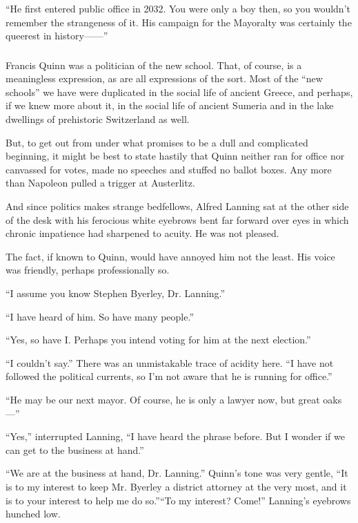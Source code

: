 \documentclass[10pt,a5paper,twoside]{book}
\begin{document}
“He first entered public office in 2032. You were only a boy then, so you wouldn’t remember the strangeness of it. His campaign for the Mayoralty was certainly the queerest in history——”

\normalfont

\subsubsection*{}
Francis Quinn was a politician of the new school. That, of course, is a meaningless expression, as are all expressions of the sort. Most of the “new schools” we have were duplicated in the social life of ancient Greece, and perhaps, if we knew more about it, in the social life of ancient Sumeria and in the lake dwellings of prehistoric Switzerland as well.

But, to get out from under what promises to be a dull and complicated beginning, it might be best to state hastily that Quinn neither ran for office nor canvassed for votes, made no speeches and stuffed no ballot boxes. Any more than Napoleon pulled a trigger at Austerlitz.

And since politics makes strange bedfellows, Alfred Lanning sat at the other side of the desk with his ferocious white eyebrows bent far forward over eyes in which chronic impatience had sharpened to acuity. He was not pleased.

The fact, if known to Quinn, would have annoyed him not the least. His voice was friendly, perhaps professionally so.

“I assume you know Stephen Byerley, Dr. Lanning.”

“I have heard of him. So have many people.”

“Yes, so have I. Perhaps you intend voting for him at the next election.”

“I couldn’t say.” There was an unmistakable trace of acidity here. “I have not followed the political currents, so I’m not aware that he is running for office.”

“He may be our next mayor. Of course, he is only a lawyer now, but great oaks —”

“Yes,” interrupted Lanning, “I have heard the phrase before. But I wonder if we can get to the business at hand.”

“We are at the business at hand, Dr. Lanning.” Quinn’s tone was very gentle, “It is to my interest to keep Mr. Byerley a district attorney at the very most, and it is to your interest to help me do so.”“To my interest? Come!” Lanning’s eyebrows hunched low.
\end{document}
